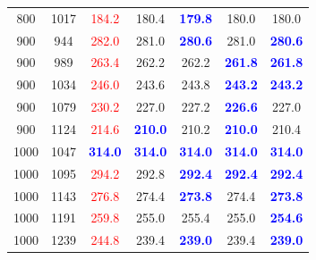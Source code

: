 \begin{tabular}{|cc|c|cccc|}
800 & 1017 & \textcolor{red}{184.2} & 180.4 & \textbf{\textcolor{blue}{179.8}} & 180.0 & 180.0\\
900 & 944 & \textcolor{red}{282.0} & 281.0 & \textbf{\textcolor{blue}{280.6}} & 281.0 & \textbf{\textcolor{blue}{280.6}}\\
900 & 989 & \textcolor{red}{263.4} & 262.2 & 262.2 & \textbf{\textcolor{blue}{261.8}} & \textbf{\textcolor{blue}{261.8}}\\
900 & 1034 & \textcolor{red}{246.0} & 243.6 & 243.8 & \textbf{\textcolor{blue}{243.2}} & \textbf{\textcolor{blue}{243.2}}\\
900 & 1079 & \textcolor{red}{230.2} & 227.0 & 227.2 & \textbf{\textcolor{blue}{226.6}} & 227.0\\
900 & 1124 & \textcolor{red}{214.6} & \textbf{\textcolor{blue}{210.0}} & 210.2 & \textbf{\textcolor{blue}{210.0}} & 210.4\\
1000 & 1047 & \textbf{\textcolor{blue}{314.0}} & \textbf{\textcolor{blue}{314.0}} & \textbf{\textcolor{blue}{314.0}} & \textbf{\textcolor{blue}{314.0}} & \textbf{\textcolor{blue}{314.0}}\\
1000 & 1095 & \textcolor{red}{294.2} & 292.8 & \textbf{\textcolor{blue}{292.4}} & \textbf{\textcolor{blue}{292.4}} & \textbf{\textcolor{blue}{292.4}}\\
1000 & 1143 & \textcolor{red}{276.8} & 274.4 & \textbf{\textcolor{blue}{273.8}} & 274.4 & \textbf{\textcolor{blue}{273.8}}\\
1000 & 1191 & \textcolor{red}{259.8} & 255.0 & 255.4 & 255.0 & \textbf{\textcolor{blue}{254.6}}\\
1000 & 1239 & \textcolor{red}{244.8} & 239.4 & \textbf{\textcolor{blue}{239.0}} & 239.4 & \textbf{\textcolor{blue}{239.0}}\\
\hline
\end{tabular}